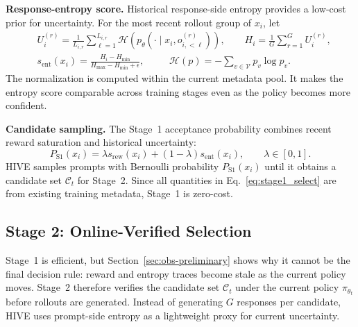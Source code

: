 \textbf{Response-entropy score.}
Historical response-side entropy provides a low-cost prior for uncertainty. For the most recent rollout group of $x_i$, let
\begin{equation}
\label{eq:stage1_entropy_score}
\begin{aligned}
&U_i^{(r)}
=\frac{1}{L_{i,r}}\sum_{\ell=1}^{L_{i,r}}
\mathcal{H}\!\left(p_{\theta}(\cdot\mid x_i,o_{i,<\ell}^{(r)})\right),
\qquad
H_i=\frac{1}{G}\sum_{r=1}^{G}U_i^{(r)},\\
&s_{\mathrm{ent}}(x_i)
=\frac{H_i-H_{\min}}{H_{\max}-H_{\min}+\epsilon},
\qquad\;\;
\mathcal{H}(p)=-\sum_{v\in\mathcal{V}}p_v\log p_v .
\end{aligned}
\end{equation}
The normalization is computed within the current metadata pool. It makes the entropy score comparable across training stages even as the policy becomes more confident.

\textbf{Candidate sampling.}
The Stage~1 acceptance probability combines recent reward saturation and historical uncertainty:
\begin{equation}
\label{eq:stage1_select}
P_{\mathrm{S1}}(x_i)
=
\lambda s_{\mathrm{rew}}(x_i)
+(1-\lambda)s_{\mathrm{ent}}(x_i),
\qquad \lambda\in[0,1].
\end{equation}
HIVE samples prompts with Bernoulli probability $P_{\mathrm{S1}}(x_i)$ until it obtains a candidate set $\mathcal{C}_t$ for Stage~2. Since all quantities in Eq.~\eqref{eq:stage1_select} are from existing training metadata, Stage~1 is zero-cost.

\subsection{Stage 2: Online-Verified Selection}
\label{subsec:stage2}
Stage~1 is efficient, but Section~\ref{sec:obs-preliminary} shows why it cannot be the final decision rule: reward and entropy traces become stale as the current policy moves. Stage~2 therefore verifies the candidate set $\mathcal{C}_t$ under the current policy $\pi_{\theta_t}$ before rollouts are generated. Instead of generating $G$ responses per candidate, HIVE uses prompt-side entropy as a lightweight proxy for current uncertainty.

